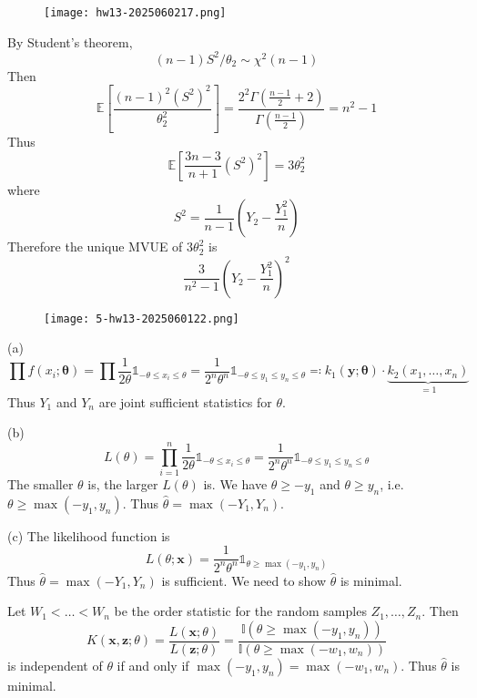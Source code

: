\begin{figure}[H]
\centering
\texttt{[image: hw13-2025060217.png]}
\label{}
\end{figure}
By Student's theorem,
\[
(n-1)S^2/\theta_2\sim \chi^{2}(n-1)
\]
Then
\[
\mathbb{E}\left[ \frac{(n-1)^2(S^2)^2}{\theta_2^2} \right]=\frac{2^{2}\Gamma\left( \frac{n-1}{2}+2 \right)}{\Gamma\left( \frac{n-1}{2} \right)}=n^2-1
\]
Thus
\[
\mathbb{E}\left[ \frac{3n-3}{n+1}(S^2)^2 \right]=3\theta_2^2
\]
where
\[
S^2=\frac{1}{n-1}\left( Y_2-\frac{Y_1^2}{n} \right)
\]
Therefore the unique MVUE of $3\theta_2^2$ is
\[
\frac{3}{n^2-1}\left( Y_2-\frac{Y_1^2}{n} \right)^2
\]
\begin{exercise}
\begin{figure}[H]
\centering
\texttt{[image: 5-hw13-2025060122.png]}
\label{}
\end{figure}
\end{exercise}
(a)
\[
\prod f(x_i;\boldsymbol{\theta})=\prod\frac{1}{2\theta}\mathbb{1}_{-\theta\leq x_i\leq \theta}=\frac{1}{2^{n}\theta^{n}}\mathbb{1}_{-\theta\leq y_1\leq y_n\leq \theta}\eqqcolon k_1(\mathbf{y};\boldsymbol{\theta})\cdot \underbrace{ k_2(x_1,\dots, x_n) }_{ =1 }
\]
Thus $Y_1$ and $Y_n$ are joint sufficient statistics for $\theta$.

(b)
\[
L(\theta)=\prod_{i=1}^{n} \frac{1}{2\theta}\mathbb{1}_{-\theta\leq x_i\leq \theta}=\frac{1}{2^{n}\theta^{n}}\mathbb{1}_{-\theta\leq y_1\leq y_n\leq \theta}
\]
The smaller $\theta$ is, the larger $L(\theta)$ is. We have $\theta\geq-y_1$ and $\theta\geq y_n$, i.e. $\theta\geq \max(-y_1,y_n)$. Thus $\widehat{\theta}=\max(-Y_1,Y_n)$.

(c)
The likelihood function is
\[
L(\theta;\mathbf{x})=\frac{1}{2^{n}\theta^{n}}\mathbb{1}_{\theta\geq \max(-y_1,y_n)}
\]
Thus $\widehat{\theta}=\max(-Y_1,Y_n)$ is sufficient. We need to show $\widehat{\theta}$ is minimal.

Let $W_1<\dots<W_n$ be the order statistic for the random samples $Z_1,\dots, Z_n$. Then
\[
K(\mathbf{x},\mathbf{z};\theta)=\frac{L(\mathbf{x};\theta)}{L(\mathbf{z};\theta)}=\frac{\mathbb{I}(\theta\geq \max(-y_1,y_n))}{\mathbb{I}(\theta\geq \max(-w_1,w_n))}
\]
is independent of $\theta$ if and only if $\max(-y_1,y_n)=\max(-w_1,w_n)$. Thus $\widehat{\theta}$ is minimal.

